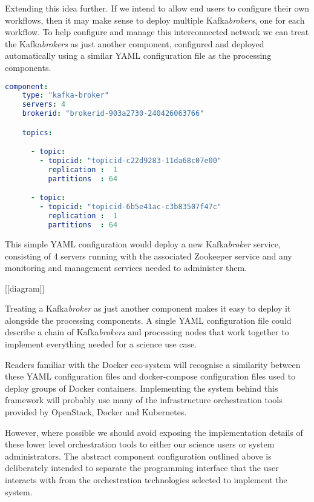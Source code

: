 \documentclass{article}
\newcommand{\yaml} {YAML\xspace}
\newcommand{\docker} {Docker\xspace}
\newcommand{\dockercompose} {docker-compose\xspace}
\newcommand{\openstack} {OpenStack\xspace}
\newcommand{\kafka} {Kafka\xspace}
\newcommand{\zookeeper} {Zookeeper\xspace}
\newcommand{\kfbroker} {\textit{broker}\xspace}
\newcommand{\kfbrokers} {\textit{brokers}\xspace}
\newcommand{\kubernetes} {Kubernetes\xspace}
\begin{document}
Extending this idea further.
If we intend to allow end users to configure their own workflows, then it may make sense to deploy multiple \kafka \kfbrokers, one for each workflow.
To help configure and manage this interconnected network we can treat the \kafka \kfbrokers as just another component, configured and deployed automatically using a similar \yaml configuration file as the processing components.

\begin{lstlisting}[language=yaml]
  component:
    type: "kafka-broker"
    servers: 4 
    brokerid: "brokerid-903a2730-240426063766"

    topics:

      - topic:
        - topicid: "topicid-c22d9283-11da68c07e00"
          replication :  1
          partitions  : 64

      - topic:
        - topicid: "topicid-6b5e41ac-c3b83507f47c"
          replication :  1
          partitions  : 64
\end{lstlisting}

This simple \yaml configuration would deploy a new \kafka \kfbroker service, consisting of 4 servers running \kafa with the associated \zookeeper service and any monitoring and management services needed to administer them.

[[diagram]]

Treating a \kafka \kfbroker as just another component makes it easy to deploy it alongside the processing components. A single \yaml configuration file could describe a chain of \kafka \kfbrokers and processing nodes that work together to implement everything needed for a science use case.

Readers familiar with the \docker eco-system will recognise a similarity between these \yaml configuration files and \dockercompose configuration files used to deploy groups of \docker containers.
Implementing the system behind this framework will probably use many of the infrastructure orchestration tools provided by \openstack, \docker and \kubernetes.

However, where possible we should avoid exposing the implementation details of
these lower level orchestration tools to either our science users or system administrators. The abstract component configuration outlined above is deliberately intended to separate the programming interface that the user interacts with from the orchestration technologies selected to implement the system.
\end{document}
